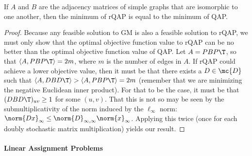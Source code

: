 

\begin{lem}
If $A$ and $B$ are the adjacency matrices of simple graphs that are isomorphic to one another, then the minimum of rQAP is equal to the minimum of QAP.
\end{lem}

\begin{proof}
Because any feasible solution to GM is also a feasible solution to rQAP, we must only show that the optimal objective function value to rQAP can be no better than the optimal objective function value of QAP.  Let $A=PBP\T$, so that $\langle A, PBP\T\rangle=2m$, where $m$ is the number of edges in $A$.  If rQAP could achieve a lower objective value, then it must be that there exists a $D \in \mc{D}$ such that $\langle A, DBD\T\rangle > \langle A, PBP\T\rangle = 2m$ (remember that we are minimizing the negative Euclidean inner product). For that to be the case, it must be that $(DBD\T)_{uv} \geq 1$ for some $(u,v)$.  That this is not so may be seen by the submultiplicativity of the norm induced by the $\ell_{\infty}$ norm:
$\norm{Dx}_\infty \leq \norm{D}_{\infty,\infty} \norm{x}_\infty$.  Applying this twice (once for each doubly stochastic matrix multiplication) yields our result.
\end{proof}


\paragraph{Linear Assignment Problems} %


